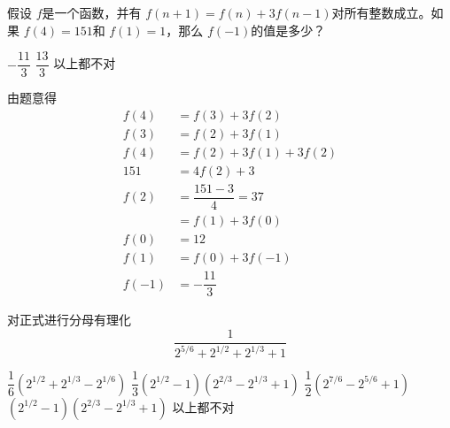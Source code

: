\documentclass[answers]{exam}
\begin{document}
\begin{questions}
	\question 假设 \( f \)是一个函数，并有 \( f(n+1) = f(n) + 3f(n-1) \)对所有整数成立。如果 \( f(4) = 151 \)和 \( f(1)
	= 1\)，那么 \( f(-1) \)的值是多少？

	\begin{oneparchoices}
		  \CorrectChoice \( -\dfrac{11}{3} \) \choice \( \dfrac{13}{3} \) \choice 以上都不对
	\end{oneparchoices}

	\begin{solution}
		由题意得
		\begin{align*}
			f(4)  & = f(3) + 3f(2)           \\
			f(3)  & = f(2) + 3f(1)           \\
			f(4)  & = f(2) + 3f(1) + 3f(2)   \\
			151   & = 4f(2) + 3              \\
			f(2)  & = \dfrac{151 -3}{4} = 37 \\
			      & = f(1) + 3f(0)           \\
			f(0)  & = 12                     \\
			f(1)  & = f(0) + 3f(-1)          \\
			f(-1) & = -\dfrac{11}{3}
		\end{align*}
	\end{solution}

	\question 对正式进行分母有理化
	\begin{equation*}
		\dfrac{1}{2^{5/6} + 2^{1/2} + 2^{1/3} + 1}
	\end{equation*}

	\begin{oneparchoices}
		\choice \( \dfrac{1}{6}(2^{1/2} + 2^{1/3} - 2^{1/6}) \)
		\choice \( \dfrac{1}{3}(2^{1/2} - 1)(2^{2/3} - 2^{1/3} + 1) \)
		\choice \( \dfrac{1}{2}(2^{7/6} - 2^{5/6} + 1) \)
		\choice \( (2^{1/2} - 1)(2^{2/3} - 2^{1/3} + 1) \)
		\choice 以上都不对
	\end{oneparchoices}


\end{questions}
\end{document}
